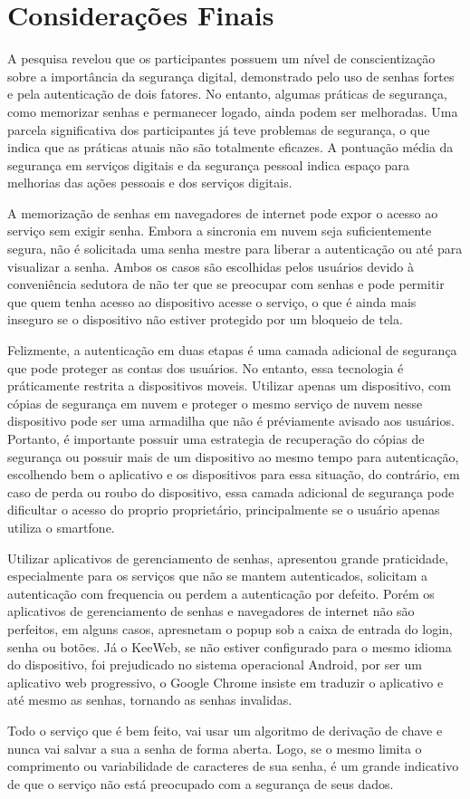 \documentclass[12pt]{article}
\begin{document}
\section{Considerações Finais}

A pesquisa revelou que os participantes possuem um nível de conscientização sobre
a importância da segurança digital, demonstrado pelo uso de senhas fortes e pela
autenticação de dois fatores.
No entanto, algumas práticas de segurança, como memorizar senhas e permanecer
logado, ainda podem ser melhoradas.
Uma parcela significativa dos participantes já teve problemas de segurança, o que
indica que as práticas atuais não são totalmente eficazes.
A pontuação média da segurança em serviços digitais e da segurança pessoal indica
espaço para melhorias das ações pessoais e dos serviços digitais.

A memorização de senhas em navegadores de internet pode expor o acesso ao serviço
sem exigir senha.
Embora a sincronia em nuvem seja suficientemente segura, não é solicitada uma
senha mestre para liberar a autenticação ou até para visualizar a senha.
Ambos os casos são escolhidas pelos usuários devido à conveniência sedutora de não
ter que se preocupar com senhas e pode permitir que quem tenha acesso ao
dispositivo acesse o serviço, o que é ainda mais inseguro se o dispositivo não
estiver protegido por um bloqueio de tela.


Felizmente, a autenticação em duas etapas é uma camada adicional de segurança que
pode proteger as contas dos usuários.
No entanto, essa tecnologia é práticamente restrita a dispositivos moveis.
Utilizar apenas um dispositivo, com cópias de segurança em nuvem e proteger o mesmo serviço de
nuvem nesse dispositivo pode ser uma armadilha que não é préviamente avisado aos
usuários.
Portanto, é importante possuir uma estrategia de recuperação do cópias de segurança ou possuir
mais de um dispositivo ao mesmo tempo para autenticação, escolhendo bem o
aplicativo e os dispositivos para essa situação, do contrário, em caso de perda
ou roubo do dispositivo, essa camada adicional de segurança pode dificultar o
acesso do proprio proprietário, principalmente se o usuário apenas utiliza o
smartfone.

Utilizar aplicativos de gerenciamento de senhas, apresentou grande praticidade,
especialmente para os serviços que não se mantem autenticados, solicitam a
autenticação com frequencia ou perdem a autenticação por defeito.
Porém os aplicativos de gerenciamento de senhas e navegadores de internet não
são perfeitos, em alguns casos, apresnetam o popup sob a caixa de entrada do
login, senha ou botões.
Já o KeeWeb, se não estiver configurado para o mesmo idioma do dispositivo, foi
prejudicado no sistema operacional Android, por ser um aplicativo web progressivo,
o Google Chrome insiste em traduzir o aplicativo e até mesmo as senhas, tornando
as senhas invalidas.

Todo o serviço que é bem feito, vai usar um algoritmo de derivação de chave e
nunca vai salvar a sua a senha de forma aberta.
Logo, se o mesmo limita o comprimento ou variabilidade de caracteres de sua senha,
é um grande indicativo de que o serviço não está preocupado com a segurança de
seus dados.



\end{document}
